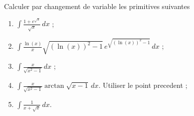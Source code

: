 
\begin{exercice}\label{exoanalyseCTU-0104}

Calculer par changement de variable les primitives suivantes

\begin{multicols}{2}
  \begin{enumerate}
  \item $\displaystyle \int \frac{1+e^{\sqrt{x}}}{\sqrt{x}}\, dx$ ;
  \item $\displaystyle \int \frac{\ln(x)}{x}\sqrt{(\ln(x))^2-1}\, e^{\sqrt{(\ln(x))^2-1}}\, dx$ ;
  \item $\displaystyle \int \frac{x}{\sqrt{x^2-1}}\, dx$ ;
  \item $\displaystyle \int  \frac{x}{\sqrt{x^2-1}} \arctan{\sqrt{x-1}}\, dx$. Utiliser le point precedent ; 
  \item $\displaystyle \int \frac{1}{x+\sqrt{x}}\, dx$. 
  \end{enumerate}
\end{multicols}

\end{exercice}

